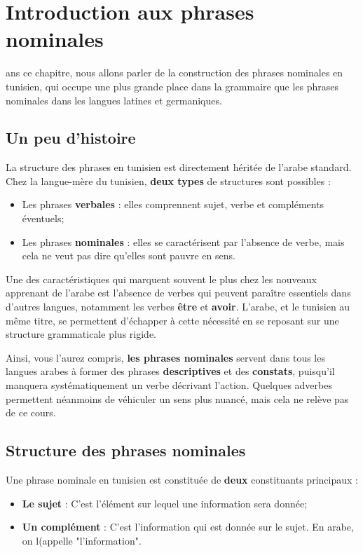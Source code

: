 \chapter{Introduction aux phrases nominales}
ans ce chapitre, nous allons parler de la construction des phrases nominales en tunisien, qui occupe une plus grande place dans la grammaire que les phrases nominales dans les langues latines et germaniques. 

\section{Un peu d'histoire}
La structure des phrases en tunisien est directement héritée de l'arabe standard. Chez la langue-mère du tunisien, \textbf{deux types} de structures sont possibles :
\begin{itemize}
    \item Les phrases \textbf{verbales} : elles comprennent sujet, verbe et compléments éventuels;
    \item Les phrases \textbf{nominales} : elles se caractérisent par l'absence de verbe, mais cela ne veut pas dire qu'elles sont pauvre en sens.
\end{itemize}

Une des caractéristiques qui marquent souvent le plus chez les nouveaux apprenant de l'arabe est l'absence de verbes qui peuvent paraître essentiels dans d'autres langues, notamment les verbes \textbf{être} et \textbf{avoir}. L'arabe, et le tunisien au même titre, se permettent d'échapper à cette nécessité en se reposant sur une structure grammaticale plus rigide. 

Ainsi, vous l'aurez compris, \textbf{les phrases nominales} servent dans tous les langues arabes à former des phrases \textbf{descriptives} et des \textbf{constats}, puisqu'il manquera systématiquement un verbe décrivant l'action. Quelques adverbes permettent néanmoins de véhiculer un sens plus nuancé, mais cela ne relève pas de ce cours. 

\section{Structure des phrases nominales}
Une phrase nominale en tunisien est constituée de \textbf{deux} constituants principaux :
\begin{itemize}
    \item \textbf{Le sujet} : C'est l'élément sur lequel une information sera donnée;
    \item \textbf{Un complément} : C'est l'information qui est donnée sur le sujet. En arabe, on l(appelle "l'information".
\end{itemize}

